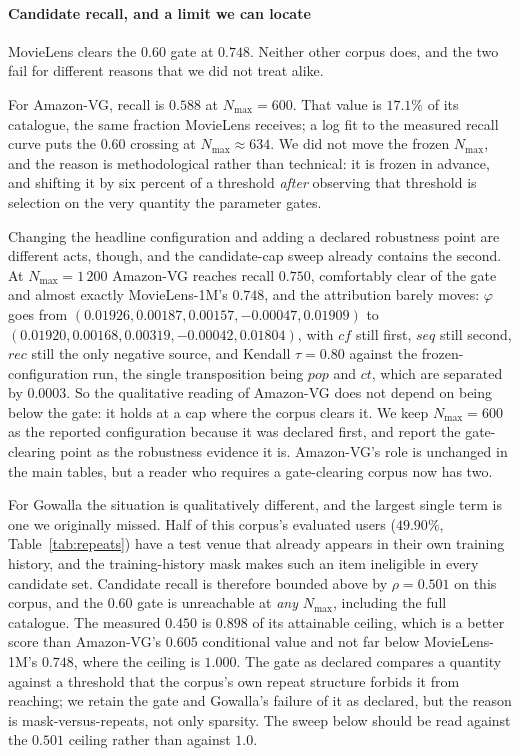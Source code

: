 \documentclass[pdflatex,sn-basic,Numbered]{sn-jnl}
\theoremstyle{plain}
\theoremstyle{definition}
\begin{document}
\paragraph{Candidate recall, and a limit we can locate}
MovieLens clears the $0.60$ gate at $0.748$. Neither other corpus does, and the
two fail for different reasons that we did not treat alike.

For Amazon-VG, recall is $0.588$ at $N_{\max}=600$. That value is $17.1\%$ of
its catalogue, the same fraction MovieLens receives; a log fit to the measured
recall curve puts the $0.60$ crossing at $N_{\max}\approx 634$. We did not move
the frozen $N_{\max}$, and the reason is methodological rather than
technical: it is frozen in advance, and shifting it by six percent of a
threshold \emph{after} observing that threshold is selection on the very
quantity the parameter gates.

Changing the headline configuration and adding a declared robustness point are
different acts, though, and the candidate-cap sweep already contains the
second. At $N_{\max}=1\,200$ Amazon-VG reaches recall $0.750$, comfortably
clear of the gate and almost exactly MovieLens-1M's $0.748$, and the
attribution barely moves: $\varphi$ goes from $(0.01926, 0.00187, 0.00157,
-0.00047, 0.01909)$ to $(0.01920, 0.00168, 0.00319, -0.00042, 0.01804)$, with
$cf$ still first, $seq$ still second, $rec$ still the only negative source, and
Kendall $\tau = 0.80$ against the frozen-configuration run, the single transposition
being $pop$ and $ct$, which are separated by $0.0003$. So the qualitative
reading of Amazon-VG does not depend on being below the gate: it holds at a
cap where the corpus clears it. We keep $N_{\max}=600$ as the reported
configuration because it was declared first, and report the gate-clearing point
as the robustness evidence it is. Amazon-VG's role is unchanged in the main
tables, but a reader who requires a gate-clearing corpus now has two.

For Gowalla the situation is qualitatively different, and the largest single
term is one we originally missed. Half of this corpus's evaluated users
($49.90\%$, Table~\ref{tab:repeats}) have a test venue that already appears in
their own training history, and the training-history mask makes such an item
ineligible in every candidate set. Candidate recall is therefore bounded above
by $\rho = 0.501$ on this corpus, and the $0.60$ gate is unreachable at
\emph{any} $N_{\max}$, including the full catalogue. The measured $0.450$ is
$0.898$ of its attainable ceiling, which is a better score than Amazon-VG's
$0.605$ conditional value and not far below MovieLens-1M's $0.748$, where the
ceiling is $1.000$. The gate as declared compares a quantity against a
threshold that the corpus's own repeat structure forbids it from reaching; we
retain the gate and Gowalla's failure of it as declared, but the reason is
mask-versus-repeats, not only sparsity. The sweep below should be read against
the $0.501$ ceiling rather than against $1.0$.
\end{document}
